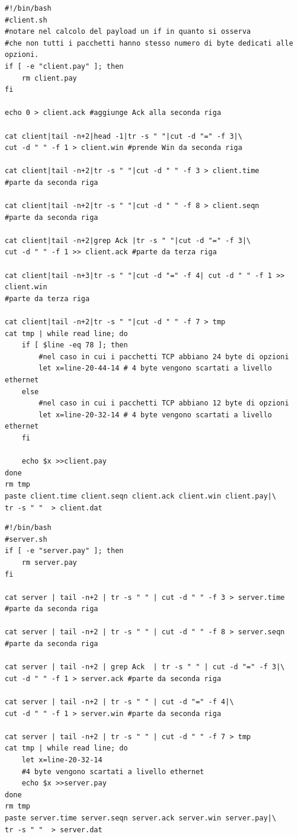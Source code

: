 \documentclass[12pt]{article}
\begin{document}
\begin{lstlisting}
#!/bin/bash
#client.sh
#notare nel calcolo del payload un if in quanto si osserva
#che non tutti i pacchetti hanno stesso numero di byte dedicati alle opzioni.
if [ -e "client.pay" ]; then
    rm client.pay
fi

echo 0 > client.ack #aggiunge Ack alla seconda riga

cat client|tail -n+2|head -1|tr -s " "|cut -d "=" -f 3|\
cut -d " " -f 1 > client.win #prende Win da seconda riga

cat client|tail -n+2|tr -s " "|cut -d " " -f 3 > client.time 
#parte da seconda riga

cat client|tail -n+2|tr -s " "|cut -d " " -f 8 > client.seqn 
#parte da seconda riga

cat client|tail -n+2|grep Ack |tr -s " "|cut -d "=" -f 3|\
cut -d " " -f 1 >> client.ack #parte da terza riga 

cat client|tail -n+3|tr -s " "|cut -d "=" -f 4| cut -d " " -f 1 >> client.win 
#parte da terza riga

cat client|tail -n+2|tr -s " "|cut -d " " -f 7 > tmp
cat tmp | while read line; do
	if [ $line -eq 78 ]; then 
        #nel caso in cui i pacchetti TCP abbiano 24 byte di opzioni
        let x=line-20-44-14 # 4 byte vengono scartati a livello ethernet
    else 
        #nel caso in cui i pacchetti TCP abbiano 12 byte di opzioni
        let x=line-20-32-14 # 4 byte vengono scartati a livello ethernet
    fi
    
    echo $x >>client.pay
done
rm tmp
paste client.time client.seqn client.ack client.win client.pay|\
tr -s " "  > client.dat
\end{lstlisting}
\begin{lstlisting}
#!/bin/bash
#server.sh
if [ -e "server.pay" ]; then
    rm server.pay
fi

cat server | tail -n+2 | tr -s " " | cut -d " " -f 3 > server.time 
#parte da seconda riga

cat server | tail -n+2 | tr -s " " | cut -d " " -f 8 > server.seqn 
#parte da seconda riga

cat server | tail -n+2 | grep Ack  | tr -s " " | cut -d "=" -f 3|\
cut -d " " -f 1 > server.ack #parte da seconda riga 

cat server | tail -n+2 | tr -s " " | cut -d "=" -f 4|\
cut -d " " -f 1 > server.win #parte da seconda riga

cat server | tail -n+2 | tr -s " " | cut -d " " -f 7 > tmp
cat tmp | while read line; do
    let x=line-20-32-14 
    #4 byte vengono scartati a livello ethernet
    echo $x >>server.pay
done
rm tmp
paste server.time server.seqn server.ack server.win server.pay|\
tr -s " "  > server.dat

\end{lstlisting}
\end{document}

